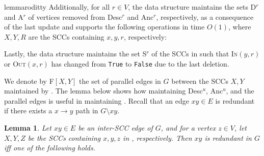 \documentclass[11pt]{article}
\newtheorem{lemma}[theorem]{Lemma}
\newcommand{\graph}[1]{\text{\( G^{#1} \)\xspace}}
\newcommand{\TR}[0]{\text{\( G^{t} \)}\xspace}
\renewcommand{\textsc}[1]{\textnormal{\scshape #1}}
\newcommand{\desc}[1]{\textrm{{\normalfont Desc}\( ^{ #1 }\)}\xspace}
\newcommand{\D}[1]{\textrm{{\normalfont D}\(^{ #1 } \)}\xspace}
\newcommand{\anc}[1]{\textrm{{\normalfont Anc}\( ^{ #1 }\)}\xspace}
\newcommand{\A}[1]{\textrm{{\normalfont A}\( ^{ #1 } \)}\xspace}
\newcommand{\s}[1]{\textrm{{\normalfont S}\( ^{ #1 } \)}\xspace}
\newcommand{\E}[1]{\text{\( E^{#1} \)}\xspace}
\newcommand{\F}[2]{\textrm{F\( [ #1, #2 ]  \)}\xspace}
\newcommand{\edge}[2]{\ensuremath{ #1 #2 }\xspace}
\begin{document}
{\begin{restatable}{lemma}{roditty}
Additionally, for all \( r \in V \), the data structure maintains the sets \D{r} and \A{r} of vertices removed from \desc{r} and \anc{r}, respectively, as a consequence of the last update and supports the following operations in time \( O(1) \), where \( X, Y, R \) are the SCCs containing \( x, y, r \), respectively:




Lastly, the data structure maintains the set \s{r} of the SCCs in \graph{r} such that \textsc{In\( (y, r) \)} or \textsc{Out\( (x, r) \)} has changed from \texttt{True} to \texttt{False} due to the last deletion.
 
\end{restatable}


We denote by \F{X}{Y} the set of parallel edges in \( G \) between the SCCs \( X, Y \) maintained by .
The lemma below shows how maintaining \desc{u}, \anc{u}, and the parallel edges is useful in maintaining \TR.
Recall that an edge \( \edge{x}{y} \in E \) is redundant if there exists a \( x \to y \) path in \( G \setminus xy \).




\begin{lemma}\label{lem:redundant_general}
Let \( \edge{x}{y} \in E \) be an 
 inter-SCC edge of \( G \), and for a vertex \( z \in V \), let \( X, Y, Z \) be the SCCs containing \( x, y, z \) in \graph{z}, respectively.
Then \edge{x}{y} is redundant in \( G \) iff one of the following holds.
\end{lemma}}
\end{document}

